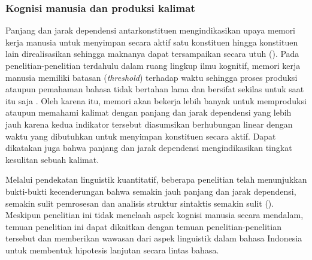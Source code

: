 \subsubsection{Kognisi manusia dan produksi kalimat}
Panjang dan jarak dependensi antarkonstituen mengindikasikan upaya memori kerja manusia untuk menyimpan secara aktif satu konstituen hingga konstituen lain direalisasikan sehingga maknanya dapat tersampaikan secara utuh (\citealp{hudson2003psychological, liu2008dependency}). Pada penelitian-penelitian terdahulu dalam ruang lingkup ilmu kognitif, memori kerja manusia memiliki batasan (\textit{threshold}) terhadap waktu sehingga proses produksi ataupun pemahaman bahasa tidak bertahan lama dan bersifat sekilas untuk saat itu saja \citep{christiansen2016now}. Oleh karena itu, memori akan bekerja lebih banyak untuk memproduksi ataupun memahami kalimat dengan panjang dan jarak dependensi yang lebih jauh karena kedua indikator tersebut diasumsikan berhubungan linear dengan waktu yang dibutuhkan untuk menyimpan konstituen secara aktif. Dapat dikatakan juga bahwa panjang dan jarak dependensi mengindikasikan tingkat kesulitan sebuah kalimat. 

Melalui pendekatan linguistik kuantitatif, beberapa penelitian telah menunjukkan bukti-bukti kecenderungan bahwa semakin jauh panjang dan jarak dependensi, semakin sulit pemrosesan dan analisis struktur sintaktis semakin sulit (\citealp{gibson1998linguistic, hiranuma1999syntactic, jiang2015effects, temperley2007minimization}). Meskipun penelitian ini tidak menelaah aspek kognisi manusia secara mendalam, temuan penelitian ini dapat dikaitkan dengan temuan penelitian-penelitian tersebut dan memberikan wawasan dari aspek linguistik dalam bahasa Indonesia untuk membentuk hipotesis lanjutan secara lintas bahasa.

